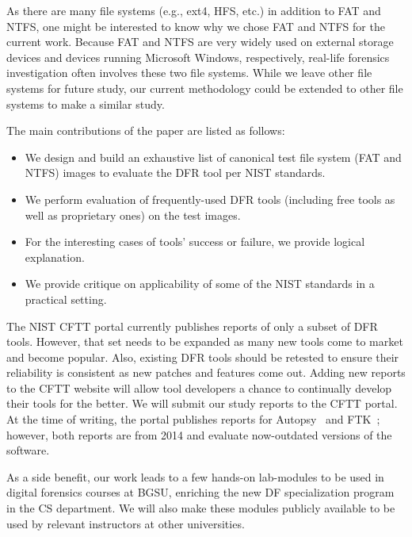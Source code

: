 As there are many file systems (e.g., ext4, HFS, etc.) in addition to FAT and NTFS, one might be interested to know why we chose FAT and NTFS for the current work. 
Because FAT and NTFS are very widely used on external storage devices and devices running Microsoft Windows, respectively,
real-life forensics investigation often involves these two file systems.
While we leave other file systems for future study, our current methodology could be 
extended to other file systems to make a similar study.

The main contributions of the paper are listed as follows:
\begin{itemize}
\item We design and build an exhaustive list of canonical test file system (FAT and NTFS) images to evaluate the DFR tool per NIST standards. 
\item We perform evaluation of frequently-used DFR tools (including free tools as well as proprietary ones) on the test images.
\item For the interesting cases of tools' success or failure, we provide logical explanation.
\item We provide critique on applicability of some of the NIST standards in a practical setting. 
\end{itemize}


The NIST CFTT portal currently publishes reports of only a subset of DFR tools. 
However, that set needs to be expanded as many new tools come to market and become popular.
Also, existing DFR tools should be retested to ensure their reliability is consistent 
as new patches and features come out. 
Adding new reports to the CFTT website will allow tool developers a 
chance to continually develop their tools for the better. We will submit our study reports to the CFTT portal.
At the time of writing, the portal publishes reports for Autopsy~\cite{dhs:autopsy} and FTK~\cite{dhs:ftk}; 
however, both reports are from 2014 and evaluate now-outdated versions of the software.

As a side benefit, our work leads to a few hands-on lab-modules to be used in digital forensics courses 
at BGSU, enriching the new DF specialization program in the CS department. We will also make these modules
publicly available to be used by relevant instructors at other universities.
